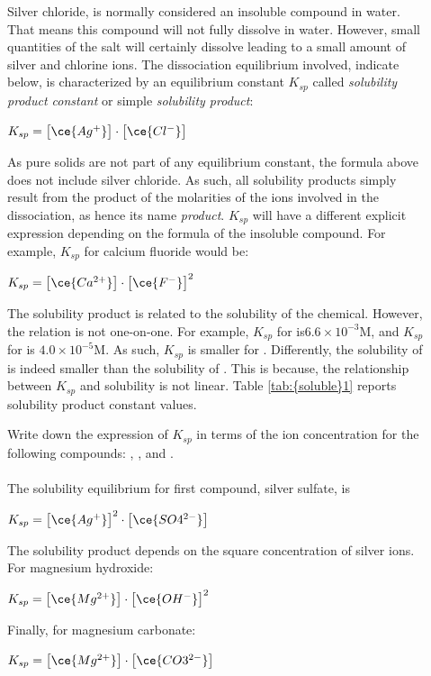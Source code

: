 \documentclass[main.tex]{subfiles}
\newcommand\chapterlabel{soluble}
\begin{document}
\begin{description}
\item[] Silver chloride,  is normally considered an insoluble compound in water. That means this compound will not fully dissolve in water. However, small quantities of the salt will certainly dissolve leading to a small amount of silver and chlorine ions. The dissociation equilibrium involved, indicate below, is characterized by an equilibrium constant $K_{sp}$ called \emph{solubility product constant} or simple \emph{solubility product}:
\begin{center}\hfill $K_{sp}= \big[ \ce{Ag^+} \big]\cdot \big[ \ce{Cl^-} \big]$\end{center}
As pure solids are not part of any equilibrium constant, the formula above does not include silver chloride. As such, all solubility products simply result from the product of the molarities of the ions involved in the dissociation, as hence its name \emph{product}. $K_{sp}$ will have a different explicit expression depending on the formula of the insoluble compound. For example, $K_{sp}$ for calcium fluoride would be:
\begin{center}\hfill $K_{sp}= \big[ \ce{Ca^{2+}} \big]\cdot \big[ \ce{F^-} \big]^2$\end{center}
The solubility product is related to the solubility of the chemical. However, the relation is not one-on-one. For example, $K_{sp}$ for  is$6.6\times 10^{-3}$M, and $K_{sp}$ for  is $4.0\times 10^{-5}$M. As such, $K_{sp}$ is smaller for . Differently, the solubility of  is indeed smaller than the solubility of . This is because, the relationship between $K_{sp}$ and solubility is not linear. Table \ref{tab:{\chapterlabel}1} reports solubility product constant values.


\begin{example} %
Write down the expression of $K_{sp}$ in terms of the ion concentration for the following compounds: , , and .
\\
\\
The solubility equilibrium for first compound, silver sulfate, is
\begin{center}\hfill $K_{sp}= \big[ \ce{Ag^+} \big]^2\cdot \big[ \ce{SO4^{2-}} \big]$\end{center}
The solubility product depends on the square concentration of silver ions. For magnesium hydroxide:
\begin{center}\hfill $K_{sp}= \big[ \ce{Mg^{2+}} \big]\cdot \big[ \ce{OH^{-}} \big]^2$\end{center}
Finally, for magnesium carbonate:
\begin{center}\hfill $K_{sp}= \big[ \ce{Mg^{2+}} \big]\cdot \big[ \ce{CO3^{2-}} \big]$\end{center}


\end{example}
\end{description}
\end{document}
